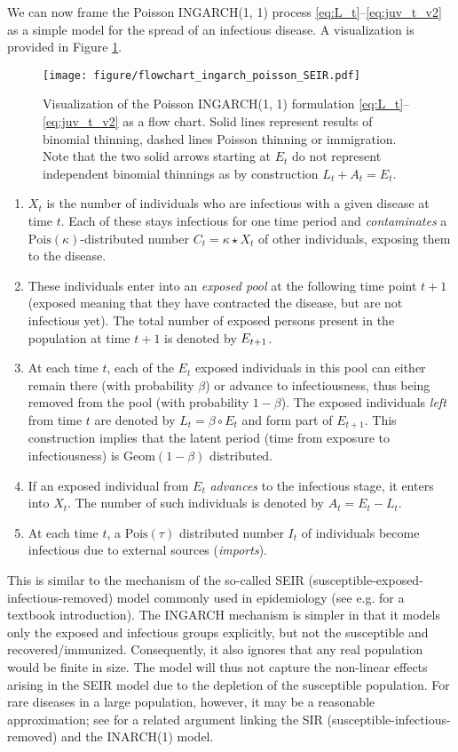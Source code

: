 \documentclass{article}
\begin{document}
We can now frame the Poisson INGARCH(1, 1) process \eqref{eq:L_t}--\eqref{eq:juv_t_v2} as a simple model for the spread of an infectious disease. A visualization is provided in Figure \ref{fig:ingarch_flowchart_poisson}.

\begin{figure}
\center
\texttt{[image: figure/flowchart\_ingarch\_poisson\_SEIR.pdf]}
\caption{Visualization of the Poisson INGARCH(1, 1) formulation \eqref{eq:L_t}--\eqref{eq:juv_t_v2} as a flow chart. Solid lines represent results of binomial thinning, dashed lines Poisson thinning or immigration. Note that the two solid arrows starting at $E_t$ do not represent independent binomial thinnings as by construction  $L_t + A_t = E_t$.}
\label{fig:ingarch_flowchart_poisson}
\end{figure}

\begin{enumerate}
\item $X_t$ is the number of individuals who are infectious with a given disease at time $t$. Each of these stays infectious for one time period and \textit{contaminates} a $\text{Pois}(\kappa)$-distributed number $C_t = \kappa \star X_t$ of other individuals, exposing them to the disease.
\item These individuals enter into an \textit{exposed pool} at the following time point $t + 1$ (exposed meaning that they have contracted the disease, but are not infectious yet). The total number of exposed persons present in the population at time $t + 1$ is denoted by $E_{t + 1}$.
\item At each time $t$, each of the $E_t$ exposed individuals in this pool can either remain there (with probability $\beta$) or advance to infectiousness, thus being removed from the pool (with probability $1 - \beta$). The exposed individuals \textit{left} from time $t$ are denoted by $L_t = \beta \circ E_t$ and form part of $E_{t + 1}$. This construction implies that the latent period (time from exposure to infectiousness) is $\text{Geom}(1- \beta)$ distributed.
\item If an exposed individual from $E_t$ \textit{advances} to the infectious stage, it enters into $X_t$. The number of such individuals is denoted by $A_t = E_t - L_t$.
\item At each time $t$, a $\text{Pois}(\tau)$ distributed number $I_t$ of individuals become infectious due to external sources (\textit{imports}).
\end{enumerate}
This is similar to the mechanism of the so-called SEIR (susceptible-exposed-infectious-removed) model commonly used in epidemiology (see e.g. \citep{Britton2019} for a textbook introduction). The INGARCH mechanism is simpler in that it models only the exposed and infectious groups explicitly, but not the susceptible and recovered/immunized. Consequently, it also ignores that any real population would be finite in size. The model will thus not capture the non-linear effects arising in the SEIR model due to the depletion of the susceptible population. For rare diseases in a large population, however, it may be a reasonable approximation; see \citep{Bauer2018} for a related argument linking the SIR (susceptible-infectious-removed) and the INARCH(1) model.
\end{document}
